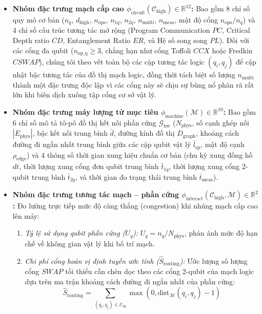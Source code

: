 \documentclass[11pt, a4paper]{article}
\begin{document}
\begin{itemize}
    \item \textbf{Nhóm đặc trưng mạch cấp cao $\phi_{\text{circuit}}(\mathcal{C}_{\text{high}}) \in \mathbb{R}^{12}$:} Bao gồm 8 chỉ số quy mô cơ bản ($n_q$, $d_{\text{high}}$, $n_{\text{ops}}$, $n_{1q}$, $n_{2q}$, $n_{\text{multi}}$, $n_{\text{meas}}$, mật độ cổng $n_{\text{ops}}/n_q$) và 4 chỉ số cấu trúc tương tác mở rộng (Program Communication $PC$, Critical Depth ratio $CD$, Entanglement Ratio $ER$, và Hệ số song song $PL$). Đối với các cổng đa qubit ($n_{\text{op\_q}} \ge 3$, chẳng hạn như cổng Toffoli $CCX$ hoặc Fredkin $CSWAP$), chúng tôi theo vết toàn bộ các cặp tương tác logic $(q_i, q_j)$ để cập nhật bậc tương tác của đồ thị mạch logic, đồng thời tách biệt số lượng $n_{\text{multi}}$ thành một đặc trưng độc lập vì các cổng này sẽ chịu sự bùng nổ phân rã rất lớn khi biên dịch xuống tập cổng cơ sở vật lý.
    \item \textbf{Nhóm đặc trưng máy lượng tử mục tiêu $\phi_{\text{machine}}(\mathcal{M}) \in \mathbb{R}^{10}$:} Bao gồm 6 chỉ số mô tả tô-pô đồ thị kết nối phần cứng $\mathcal{G}_{\text{hw}}$ ($N_{\text{phys}}$, số cạnh ghép nối $|E_{\text{phys}}|$, bậc kết nối trung bình $\bar{d}$, đường kính đồ thị $D_{\text{graph}}$, khoảng cách đường đi ngắn nhất trung bình giữa các cặp qubit vật lý $\bar{l}_{\text{sp}}$, mật độ cạnh $\rho_{\text{edge}}$) và 4 thông số thời gian xung hiệu chuẩn cơ bản (chu kỳ xung đồng hồ $dt$, thời lượng xung cổng đơn qubit trung bình $\bar{t}_{1q}$, thời lượng xung cổng 2-qubit trung bình $\bar{t}_{2q}$, và thời gian đo trạng thái trung bình $\bar{t}_{\text{meas}}$).
    \item \textbf{Nhóm đặc trưng tương tác mạch -- phần cứng $\phi_{\text{interact}}(\mathcal{C}_{\text{high}}, \mathcal{M}) \in \mathbb{R}^{2}$:} Đo lường trực tiếp mức độ căng thẳng (congestion) khi nhúng mạch cấp cao lên máy:
    \begin{enumerate}
        \item \textit{Tỷ lệ sử dụng qubit phần cứng ($U_q$):} $U_q = n_q / N_{\text{phys}}$, phản ánh mức độ hạn chế về không gian vật lý khi bố trí mạch.
        \item \textit{Chi phí cổng hoán vị định tuyến ước tính ($\hat{S}_{\text{routing}}$):} Ước lượng số lượng cổng $SWAP$ tối thiểu cần chèn dọc theo các cổng 2-qubit của mạch logic dựa trên ma trận khoảng cách đường đi ngắn nhất của phần cứng:
        \begin{equation}
            \hat{S}_{\text{routing}} = \sum_{(q_i, q_j) \in \mathcal{E}_{2q}} \max\left(0, \text{dist}_{\mathcal{M}}(q_i, q_j) - 1\right)

\end{equation}
\end{enumerate}
\end{itemize}
\end{document}
